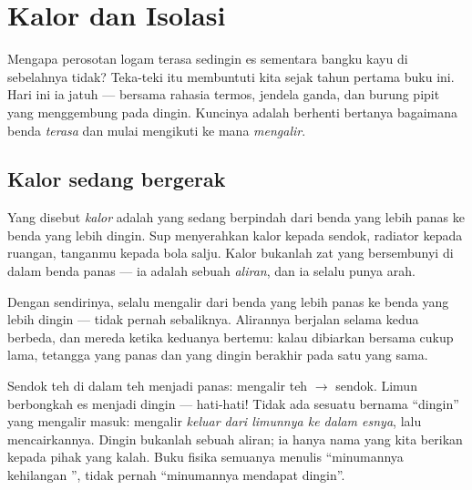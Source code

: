 \chapter{Kalor dan Isolasi}\label{ch:g5:heat-and-insulation}

Mengapa perosotan logam terasa sedingin es sementara bangku kayu di
sebelahnya tidak? Teka-teki itu membuntuti kita sejak tahun pertama
buku ini. Hari ini ia jatuh --- bersama rahasia termos, jendela ganda,
dan burung pipit yang menggembung pada  dingin. Kuncinya adalah
berhenti bertanya bagaimana benda \emph{terasa} dan mulai mengikuti ke
mana  \emph{mengalir}.

\section{Kalor sedang bergerak}

\begin{definition}[Kalor]\label{def:g5:heat-and-insulation:heat}
Yang disebut \emph{kalor} adalah  yang sedang
berpindah dari benda yang lebih panas ke benda yang lebih dingin. Sup
menyerahkan kalor kepada sendok, radiator kepada ruangan, tanganmu
kepada bola salju. Kalor bukanlah zat yang bersembunyi di dalam benda
panas --- ia adalah sebuah \emph{aliran}, dan ia selalu punya arah.
\end{definition}

\begin{proposition}\label{prop:g5:heat-and-insulation:downhill}
Dengan sendirinya,  selalu mengalir dari benda yang lebih panas
ke benda yang lebih dingin --- tidak pernah sebaliknya. Alirannya
berjalan selama kedua  berbeda, dan mereda ketika keduanya
bertemu: kalau dibiarkan bersama cukup lama, tetangga yang panas dan
yang dingin berakhir pada satu  yang sama.
\end{proposition}

\begin{example}\label{ex:g5:heat-and-insulation:direction}
Sendok teh di dalam teh menjadi panas:  mengalir teh $\to$
sendok. Limun berbongkah es menjadi dingin --- hati-hati! Tidak ada
sesuatu bernama ``dingin'' yang mengalir masuk:  mengalir
\emph{keluar dari limunnya ke dalam esnya}, lalu mencairkannya. Dingin
bukanlah sebuah aliran; ia hanya nama yang kita berikan kepada pihak
yang kalah. Buku fisika semuanya menulis ``minumannya kehilangan
'', tidak pernah ``minumannya mendapat dingin''.
\end{example}

